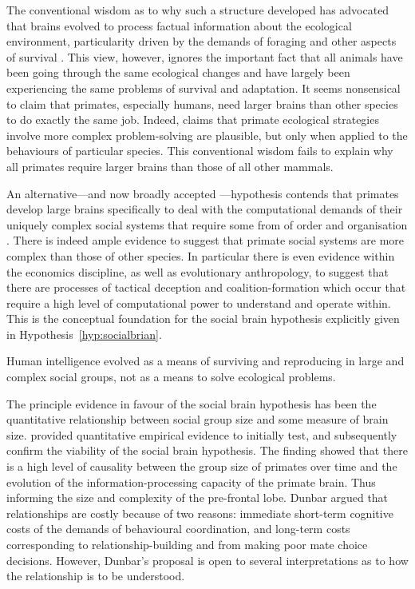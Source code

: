 The conventional wisdom as to why such a structure developed has advocated that brains evolved to process factual information about the ecological environment, particularity driven by the demands of foraging and other aspects of survival \citep{BrockHarvey1980}. This view, however, ignores the important fact that all animals have been going through the same ecological changes and have largely been experiencing the same problems of survival and adaptation. It seems nonsensical to claim that primates, especially humans, need larger brains than other species to do exactly the same job. Indeed, claims that primate ecological strategies involve more complex problem-solving are plausible, but only when applied to the behaviours of particular species. This conventional wisdom fails to explain why all primates require larger brains than those of all other mammals.

An alternative---and now broadly accepted \citep{Dunbar2009}---hypothesis contends that primates develop large brains specifically to deal with the computational demands of their uniquely complex social systems that require some from of order and organisation \citep{WhitenByrne1988}. There is indeed ample evidence to suggest that primate social systems are more complex than those of other species. In particular there is even evidence within the economics discipline, as well as evolutionary anthropology, to suggest that there are processes of tactical deception and coalition-formation which occur that require a high level of computational power to understand and operate within. This is the conceptual foundation for the social brain hypothesis explicitly given in Hypothesis~\ref{hyp:socialbrian}.

\begin{hypothesis} \label{hyp:socialbrian}
Human intelligence evolved as a means of surviving and reproducing in large and complex social groups, not as a means to solve ecological problems.
\end{hypothesis}

The principle evidence in favour of the social brain hypothesis has been the quantitative relationship between social group size and some measure of brain size. \citet{Dunbar1998} provided quantitative empirical evidence to initially test, and subsequently confirm the viability of the social brain hypothesis. The finding showed that there is a high level of causality between the group size of primates over time and the evolution of the information-processing capacity of the primate brain. Thus informing the size and complexity of the pre-frontal lobe. Dunbar argued that relationships are costly because of two reasons: immediate short-term cognitive costs of the demands of behavioural coordination, and long-term costs corresponding to relationship-building and from making poor mate choice decisions. However, Dunbar's proposal is open to several interpretations as to how the relationship is to be understood.

